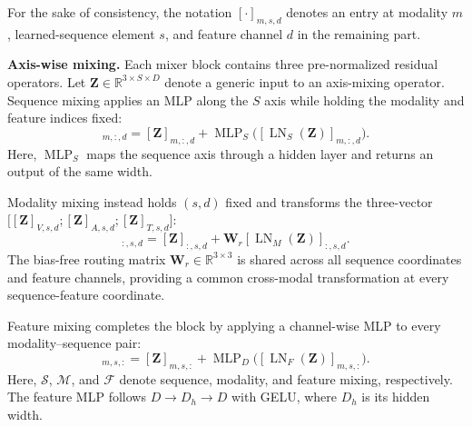 \documentclass[letterpaper]{article} %
\begin{document}
For the sake of consistency, the notation $[\cdot]_{m,s,d}$ denotes an
entry at modality $m$, learned-sequence element $s$, and feature channel
$d$ in the remaining part. 

\noindent\textbf{Axis-wise mixing.}
Each mixer block contains three pre-normalized residual operators. Let $\mathbf{Z}\in\mathbb{R}^{3\times S\times D}$ denote a generic input to an axis-mixing operator. Sequence mixing applies an MLP along the $S$ axis while holding the modality and feature indices fixed:
\begin{equation}
[\mathcal{S}(\mathbf{Z})]_{m,:,d}
=[\mathbf{Z}]_{m,:,d}
+\operatorname{MLP}_{S}
  \bigl([\operatorname{LN}_{S}(\mathbf{Z})]_{m,:,d}\bigr).
\label{eq:sequence_mixing}
\end{equation}
Here, $\operatorname{MLP}_{S}$ maps the sequence axis through a hidden
layer and returns an output of the same width.

Modality mixing instead holds $(s,d)$ fixed and transforms the
three-vector $\bigl[[\mathbf{Z}]_{V,s,d};
[\mathbf{Z}]_{A,s,d};[\mathbf{Z}]_{T,s,d}\bigr]$:
\begin{equation}
[\mathcal{M}(\mathbf{Z})]_{:,s,d}
=[\mathbf{Z}]_{:,s,d}
+\mathbf{W}_{r}
  [\operatorname{LN}_{M}(\mathbf{Z})]_{:,s,d}.
\label{eq:modality_mixing}
\end{equation}
The bias-free routing matrix
$\mathbf{W}_{r}\in\mathbb{R}^{3\times3}$ is shared across all sequence
coordinates and feature channels, providing a common cross-modal
transformation at every sequence-feature coordinate.

Feature mixing completes the block by applying a channel-wise MLP to every
modality--sequence pair:
\begin{equation}
[\mathcal{F}(\mathbf{Z})]_{m,s,:}
=[\mathbf{Z}]_{m,s,:}
+\operatorname{MLP}_{D}
  \bigl([\operatorname{LN}_{F}(\mathbf{Z})]_{m,s,:}\bigr).
\label{eq:feature_mixing}
\end{equation}
Here, $\mathcal{S}$, $\mathcal{M}$, and $\mathcal{F}$ denote sequence,
modality, and feature mixing, respectively.  The feature MLP follows
$D\!\rightarrow\!D_h\!\rightarrow\!D$ with GELU, where $D_h$ is its
hidden width.
\end{document}
